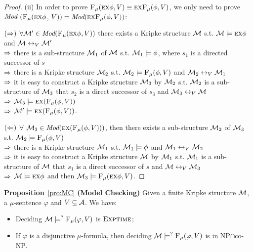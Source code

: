 \documentclass[runningheads]{llncs}
\begin{document}
\begin{proof}
(ii) In order to prove ${\textsc{F}_{\textsc{$\mu$}}}(\textsc{e} \textsc{x} \phi, V) \equiv \textsc{e}\textsc{x}{\textsc{F}_{\textsc{$\mu$}}}(\phi, V)$, we only need to prove $\textit{Mod}$ $({\textsc{F}_{\textsc{$\mu$}}}(\textsc{e} \textsc{x} \phi$, $V)) = \textit{Mod}( \textsc{e}\textsc{x}{\textsc{F}_{\textsc{$\mu$}}}(\phi, V))$:

$(\Rightarrow)$ $\forall {\cal M}' \in \textit{Mod}({\textsc{F}_{\textsc{$\mu$}}}(\textsc{e} \textsc{x} \phi, V))$ there exists a Kripke structure ${\cal M}$ s.t. ${\cal M} \models \textsc{e} \textsc{x} \phi$ and ${\cal M} \leftrightarrow_V {\cal M}'$\\
$\Rightarrow$ there is a sub-structure ${\cal M}_1$ of ${\cal M}$ s.t. ${\cal M}_1 \models \phi$, where $s_1$ is a directed successor of $s$\\
$\Rightarrow$ there is a Kripke structure ${\cal M}_2$ s.t. ${\cal M}_2 \models {\textsc{F}_{\textsc{$\mu$}}}(\phi,V)$ and ${\cal M}_2 \leftrightarrow_V {\cal M}_1$\\
$\Rightarrow$ it is easy to construct a Kripke structure ${\cal M}_3$ by ${\cal M}_2$ s.t. ${\cal M}_2$ is a sub-structure of ${\cal M}_3$ that $s_2$ is a direct successor of $s_3$ and ${\cal M}_3 \leftrightarrow_V {\cal M}$\\
$\Rightarrow$ ${\cal M}_3 \models \textsc{e} \textsc{x} ({\textsc{F}_{\textsc{$\mu$}}}(\phi,V))$\\
$\Rightarrow$ ${\cal M}' \models \textsc{e} \textsc{x} ({\textsc{F}_{\textsc{$\mu$}}}(\phi,V))$.

$(\Leftarrow)$ $\forall$ ${\cal M}_3 \in \textit{Mod}(\textsc{e} \textsc{x} ({\textsc{F}_{\textsc{$\mu$}}}(\phi,V)))$, then there exists a sub-structure ${\cal M}_2$ of ${\cal M}_3$ s.t. ${\cal M}_2 \models {\textsc{F}_{\textsc{$\mu$}}}(\phi,V)$\\
$\Rightarrow$ there is a Kripke structure ${\cal M}_1$ s.t. ${\cal M}_1 \models \phi$ and ${\cal M}_1 \leftrightarrow_V {\cal M}_2$\\
$\Rightarrow$ it is easy to construct a Kripke structure ${\cal M}$ by ${\cal M}_1$ s.t. ${\cal M}_1$ is a sub-structure of ${\cal M}$ that $s_1$ is a direct successor of $s$ and ${\cal M}\leftrightarrow_V {\cal M}_3$\\
$\Rightarrow$ ${\cal M} \models \textsc{e} \textsc{x} \phi$ and then ${\cal M}_3 \models {\textsc{F}_{\textsc{$\mu$}}}(\textsc{e} \textsc{x} \phi, V)$.

\end{proof}


\noindent\textbf{Proposition}~\ref{pro:MC} \textbf{(Model Checking)}
Given a finite Kripke structure  ${\cal M}$, a $\mu$-sentence $\varphi$ and $V\subseteq {\cal A}$. We have:
\begin{itemize}
  \item[(i)] Deciding ${\cal M} \models^? {\textsc{F}_{\textsc{$\mu$}}}(\varphi, V)$ is  $\textsc{Exptime}$;
  \item[(ii)] If $\varphi$ is a disjunctive $\mu$-formula, then deciding ${\cal M} \models^? {\textsc{F}_{\textsc{$\mu$}}}(\varphi, V)$ is in \textsc{NP}$\cap$co-\textsc{NP}.
\end{itemize}
\end{document}
